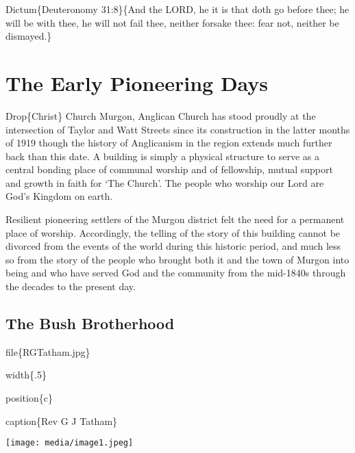 Dictum\{Deuteronomy 31:8\}\{And the LORD, he it is that doth go before thee; he will be with thee, he will not fail thee, neither forsake thee: fear not, neither be dismayed.\}

\hypertarget{the-early-pioneering-days}{%
\chapter{The Early Pioneering Days}\label{the-early-pioneering-days}}

Drop\{Christ\} Church Murgon, Anglican Church has stood proudly at the intersection of Taylor and Watt Streets since its construction in the latter months of 1919 though the history of Anglicanism in the region extends much further back than this date. A building is simply a physical structure to serve as a central bonding place of communal worship and of fellowship, mutual support and growth in faith for `The Church'. The people who worship our Lord are God's Kingdom on earth.

Resilient pioneering settlers of the Murgon district felt the need for a permanent place of worship. Accordingly, the telling of the story of this building cannot be divorced from the events of the world during this historic period, and much less so from the story of the people who brought both it and the town of Murgon into being and who have served God and the community from the mid-1840s through the decades to the present day.

\hypertarget{the-bush-brotherhood}{%
\section{The Bush Brotherhood}\label{the-bush-brotherhood}}

file\{RGTatham.jpg\}

width\{.5\}

position\{c\}

caption\{Rev G J Tatham\}

\texttt{[image: media/image1.jpeg]}

